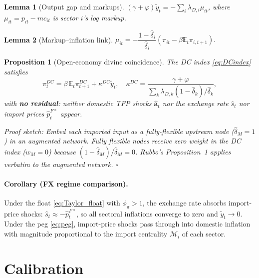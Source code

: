 \documentclass[11pt,a4paper]{article}
\newcommand{\E}{\mathbb{E}}
\newcommand{\wh}[1]{\widehat{#1}}
\providecommand{\tl}[1]{\widetilde{#1}}
\newcommand{\DC}{\pi^{DC}}
\newtheorem{proposition}{Proposition}
\newtheorem{lemma}{Lemma}
\begin{document}
\begin{lemma}[Output gap and markups]
$(\gamma+\varphi)\tl y_t=-\sum_i\lambda_{D,i}\mu_{it}$,
where $\mu_{it}=p_{it}-mc_{it}$ is sector $i$'s log markup.
\end{lemma}

\begin{lemma}[Markup–inflation link]
$\mu_{it}=-\dfrac{1-\wh\delta_i}{\wh\delta_i}(\pi_{it}-\beta\E_t\pi_{i,t+1}).$
\end{lemma}

\begin{proposition}[Open-economy divine coincidence]
\label{prop:DC}
The DC index \eqref{eq:DCindex} satisfies
\begin{equation}
\DC_t=\beta\,\E_t\DC_{t+1}+\kappa^{DC}\tl y_t,
\quad
\kappa^{DC}=\frac{\gamma+\varphi}{\displaystyle\sum_k\lambda_{D,k}(1-\wh\delta_k)/\wh\delta_k},
\end{equation}
with \textbf{no residual}: neither domestic TFP shocks $\wh{\mathbf{a}}_t$
nor the exchange rate $\wh s_t$ nor import prices $\wh p^{F*}_t$ appear.

\emph{Proof sketch:} Embed each imported input as a fully-flexible upstream
node ($\wh\delta_M=1$) in an augmented network. Fully flexible nodes receive
zero weight in the DC index ($w_M=0$) because $(1-\wh\delta_M)/\wh\delta_M=0$.
Rubbo's Proposition~1 applies verbatim to the augmented network. $\square$
\end{proposition}

\paragraph{Corollary (FX regime comparison).}
Under the float \eqref{eq:Taylor_float} with $\phi_\pi>1$, the exchange rate
absorbs import-price shocks: $\wh s_t\approx-\wh p^{F*}_t$, so all sectoral
inflations converge to zero and $\tl y_t\to 0$.  Under the peg \eqref{eq:peg},
import-price shocks pass through into domestic inflation with magnitude
proportional to the import centrality $\mathcal{M}_i$ of each sector.

\section{Calibration}
\end{document}
